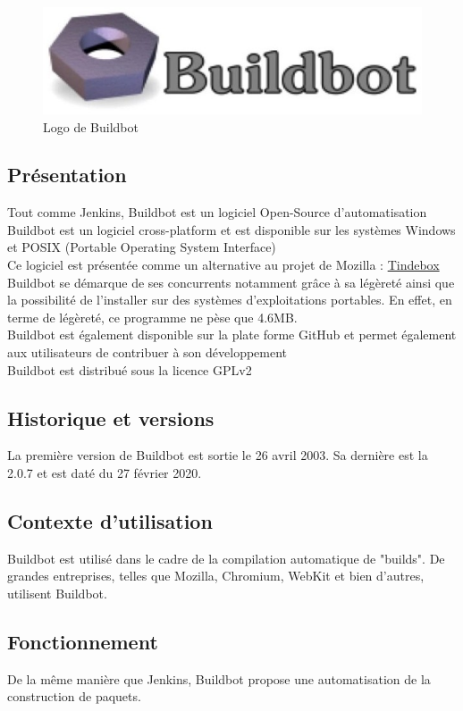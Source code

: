 \documentclass[12pt]{article}
\begin{document}
\begin{figure}[ht]
    \includegraphics[scale=0.7]{images/buildbot.jpg}
    \caption{Logo de Buildbot}
\end{figure}


\subsection{Présentation}
Tout comme Jenkins, Buildbot est un logiciel Open-Source d'automatisation
\\
Buildbot est un logiciel cross-platform et est disponible sur les systèmes Windows et POSIX (Portable Operating System Interface)
\\
Ce logiciel est présentée comme un alternative au projet de Mozilla :
\underline{Tindebox}
\\
Buildbot se démarque de ses concurrents notamment grâce à sa légèreté ainsi que la possibilité de l'installer sur des systèmes d'exploitations portables. En effet, en terme de légèreté, ce programme ne pèse que 4.6MB.
\\
Buildbot est également disponible sur la plate forme GitHub et permet également aux utilisateurs de contribuer à son développement
\\
Buildbot est distribué sous la licence GPLv2
\subsection{Historique et versions}
La première version de Buildbot est sortie le 26 avril 2003. Sa dernière est la 2.0.7 et est daté du 27 février 2020.
\subsection{Contexte d'utilisation}
Buildbot est utilisé dans le cadre de la compilation automatique de "builds". De grandes entreprises, telles que Mozilla, Chromium, WebKit et bien d'autres, utilisent Buildbot.

\subsection{Fonctionnement}
De la même manière que Jenkins, Buildbot propose une automatisation de la construction de paquets.
\end{document}
